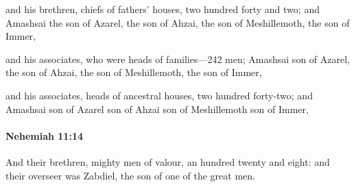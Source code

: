 			\begin{versebox}
					\item[BHS] 
					\item[LXX] 
					\item[ASV] and his brethren, chiefs of fathers' houses, two hundred forty and two; and Amashsai the son of Azarel, the son of Ahzai, the son of Meshillemoth, the son of Immer,
					\item[NIV] and his associates, who were heads of families—242 men; Amashsai son of Azarel, the son of Ahzai, the son of Meshillemoth, the son of Immer,
					\item[NRSV] and his associates, heads of ancestral houses, two hundred forty-two; and Amashsai son of Azarel son of Ahzai son of Meshillemoth son of Immer,
			\end{versebox}

		\paragraph{Nehemiah 11:14} %
			\label{NEHEMIAH-11-14}

			And their brethren, mighty men of valour, an hundred twenty and eight: and their overseer was Zabdiel, the son of one of the great men.


